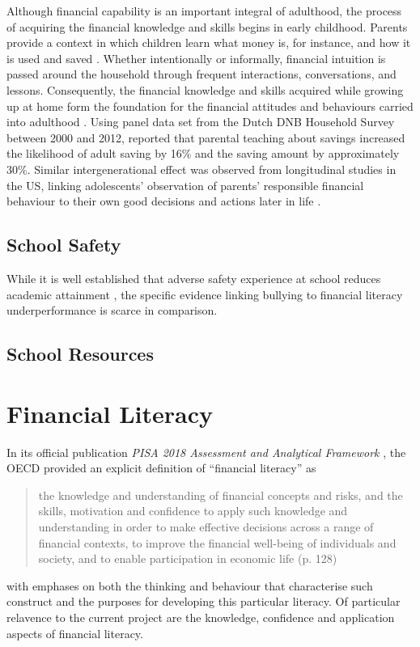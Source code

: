 \documentclass[a4paper,11pt,UKenglish,twoside,openright]{report}\usepackage[]{graphicx}\usepackage[]{color}
\begin{document}
Although financial capability is an important integral of adulthood, the process of acquiring the financial knowledge and skills begins in early childhood. Parents provide a context in which children learn what money is, for instance, and how it is used and saved \parencite{birbili:2015}. Whether intentionally or informally, financial intuition is passed around the household through frequent interactions, conversations, and lessons. Consequently, the financial knowledge and skills acquired while growing up at home form the foundation for the financial attitudes and behaviours carried into adulthood \parencite{serido:2016}. Using panel data set from the Dutch DNB Household Survey between 2000 and 2012, \textcite{bucciol:2014} reported that parental teaching about savings increased the likelihood of adult saving by 16\% and the saving amount by approximately 30\%. Similar intergenerational effect was observed from longitudinal studies in the US, linking adolescents' observation of parents' responsible financial behaviour to their own good decisions and actions later in life \parencite{tang:2017}.

\subsection{School Safety}


While it is well established that adverse safety experience at school reduces academic attainment \parencite{kutsyuruba:2015}, the specific evidence linking bullying to financial literacy underperformance is scarce in comparison.

\subsection{School Resources}

\section{Financial Literacy}\label{sec:flit}

In its official publication \textit{PISA 2018 Assessment and Analytical Framework} \parencite{PISAframework}, the OECD provided an explicit definition of ``financial literacy'' as
\vspace{-1em} %
    \blockquote{the knowledge and understanding of financial concepts and risks, and the skills, motivation and confidence to apply such knowledge and understanding in order to make effective decisions across a range of financial contexts, to improve the financial well-being of individuals and society, and to enable participation in economic life (p. 128)}
\vspace{-1em} %
with emphases on both the thinking and behaviour that characterise such construct and the purposes for developing this particular literacy. Of particular relavence to the current project are the knowledge, confidence and application aspects of financial literacy.
\end{document}
